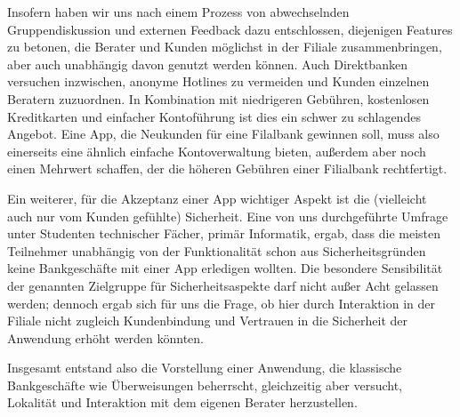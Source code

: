 Insofern haben wir uns nach einem Prozess von abwechselnden Gruppendiskussion und externen Feedback dazu entschlossen, diejenigen Features zu betonen, die Berater und Kunden möglichst in der Filiale zusammenbringen, aber auch unabhängig davon genutzt werden können. Auch Direktbanken versuchen inzwischen, anonyme Hotlines zu vermeiden und Kunden einzelnen Beratern zuzuordnen. In Kombination mit niedrigeren Gebühren, kostenlosen Kreditkarten und einfacher Kontoführung ist dies ein schwer zu schlagendes Angebot. Eine App, die Neukunden für eine Filalbank gewinnen soll, muss also einerseits eine ähnlich einfache Kontoverwaltung bieten, außerdem aber noch einen Mehrwert schaffen, der die höheren Gebühren einer Filialbank rechtfertigt.

Ein weiterer, für die Akzeptanz einer App wichtiger Aspekt ist die (vielleicht auch nur vom Kunden gefühlte) Sicherheit. Eine von uns durchgeführte Umfrage unter Studenten technischer Fächer, primär Informatik, ergab, dass die meisten Teilnehmer unabhängig von der Funktionalität schon aus Sicherheitsgründen keine Bankgeschäfte mit einer App erledigen wollten. Die besondere Sensibilität der genannten Zielgruppe für Sicherheitsaspekte darf nicht außer Acht gelassen werden; dennoch ergab sich für uns die Frage, ob hier durch Interaktion in der Filiale nicht zugleich Kundenbindung und Vertrauen in die Sicherheit der Anwendung erhöht werden könnten. 

Insgesamt entstand also die Vorstellung einer Anwendung, die klassische Bankgeschäfte wie Überweisungen beherrscht, gleichzeitig aber versucht, Lokalität und Interaktion mit dem eigenen Berater herzustellen. 